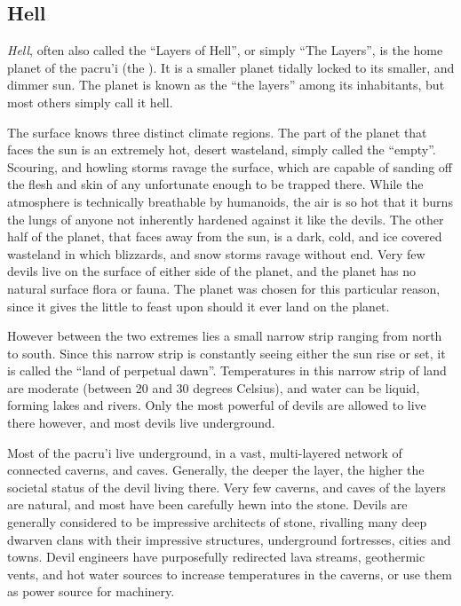\subsection{Hell}
\label{sec:Hell}

\emph{Hell}, often also called the ``Layers of Hell'', or simply ``The
Layers'', is the home planet of the pacru'i (the ). It is
a smaller planet tidally locked to its smaller, and dimmer sun. The planet is
known as the ``the layers'' among its inhabitants, but most others simply call
it hell.

The surface knows three distinct climate regions. The part of the planet that
faces the sun is an extremely hot, desert wasteland, simply called the
``empty''. Scouring, and howling storms ravage the surface, which are capable of
sanding off the flesh and skin of any unfortunate enough to be trapped there.
While the atmosphere is technically breathable by humanoids, the air is so hot
that it burns the lungs of anyone not inherently hardened against it like the
devils. The other half of the planet, that faces away from the sun, is a dark,
cold, and ice covered wasteland in which blizzards, and snow storms ravage
without end. Very few devils live on the surface of either side of the planet,
and the planet has no natural surface flora or fauna. The planet was chosen for
this particular reason, since it gives the  little to feast
upon should it ever land on the planet.

However between the two extremes lies a small narrow strip ranging from north
to south. Since this narrow strip is constantly seeing either the sun rise or
set, it is called the ``land of perpetual dawn''. Temperatures in this narrow
strip of land are moderate (between 20 and 30 degrees Celsius), and water can
be liquid, forming lakes and rivers. Only the most powerful of devils are
allowed to live there however, and most devils live underground.

Most of the pacru'i live underground, in a vast, multi-layered network of
connected caverns, and caves. Generally, the deeper the layer, the higher the
societal status of the devil living there. Very few caverns, and caves of the
layers are natural, and most have been carefully hewn into the stone. Devils
are generally considered to be impressive architects of stone, rivalling many
deep dwarven clans with their impressive structures, underground fortresses,
cities and towns. Devil engineers have purposefully redirected lava streams,
geothermic vents, and hot water sources to increase temperatures in the
caverns, or use them as power source for machinery.


